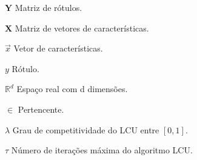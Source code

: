 
\begin{simbolos} \setlength\itemsep{-1pt}
    \item[$ \mathbf{Y} $] Matriz de rótulos.
    \item[$ \mathbf{X} $] Matriz de vetores de características.
    \item[$ \vec{x} $] Vetor de características.
    \item[$ y $] Rótulo.
    \item[$ \mathbb{R}^d $] Espaço real com d dimensões.
    \item[$ \in $] Pertencente.
	\item[$ \lambda $] Grau de competitividade do LCU entre $ \left[0, 1\right] $.
	\item[$ \tau $] Número de iterações máxima do algoritmo LCU.\@
\end{simbolos}
